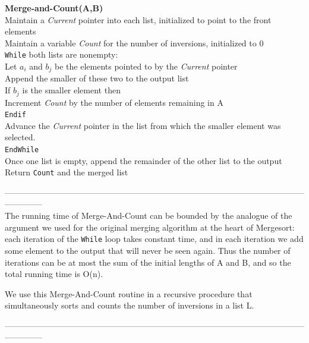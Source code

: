 \documentclass{article}
\begin{document}
\textbf{Merge-and-Count(A,B)}\\
Maintain a \emph{Current} pointer into each list, initialized to
point to the front elements\\
Maintain a variable \emph{Count} for the number of inversions,
initialized to 0\\
\texttt{While} both lists are nonempty:\\
\quad Let $a_i$ and $b_j$ be the elements pointed to by the \emph{Current} pointer\\
\quad Append the smaller of these two to the output list\\
\quad If $b_j$ is the smaller element then\\
\quad\quad Increment \emph{Count} by the number of elements remaining in A\\
\quad\texttt{Endif}\\
\quad Advance the \emph{Current} pointer in the list from which the
smaller element was selected.\\
\texttt{EndWhile}\\
Once one list is empty, append the remainder of the other list
to the output\\
Return \texttt{Count} and the merged list

\medskip

--------------------------------------------------------------------------------------------------------------------------
\medskip
\\ 

The running time of Merge-And-Count can be bounded by the analogue of the argument we used for the original merging algorithm at the heart of Mergesort: each iteration of the \texttt{While} loop takes constant time, and in each iteration we add some element to the output that will never be seen again. Thus the number of iterations can be at most the sum of the initial lengths of A and B, and so the total running time is O(n).

\medskip

We use this Merge-And-Count routine in a recursive procedure that simultaneously sorts and counts the number of inversions in a list L.\\

\medskip

--------------------------------------------------------------------------------------------------------------------------
\medskip
\end{document}
